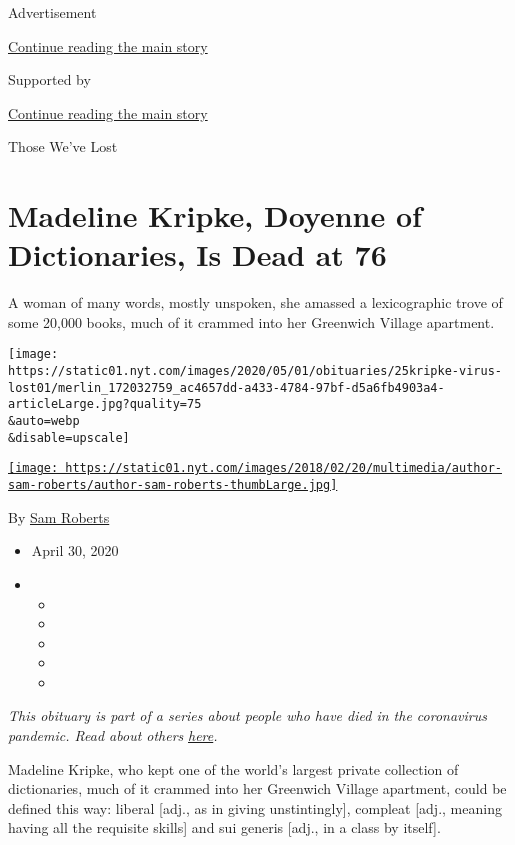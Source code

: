Advertisement

\protect\hyperlink{after-top}{Continue reading the main story}

Supported by

\protect\hyperlink{after-sponsor}{Continue reading the main story}

Those We've Lost

\hypertarget{madeline-kripke-doyenne-of-dictionaries-is-dead-at-76}{%
\section{Madeline Kripke, Doyenne of Dictionaries, Is Dead at
76}\label{madeline-kripke-doyenne-of-dictionaries-is-dead-at-76}}

A woman of many words, mostly unspoken, she amassed a lexicographic
trove of some 20,000 books, much of it crammed into her Greenwich
Village apartment.

\texttt{[image: https://static01.nyt.com/images/2020/05/01/obituaries/25kripke-virus-lost01/merlin\_172032759\_ac4657dd-a433-4784-97bf-d5a6fb4903a4-articleLarge.jpg?quality=75\\\&auto=webp\\\&disable=upscale]}

\href{https://www.nytimes.com/by/sam-roberts}{\texttt{[image: https://static01.nyt.com/images/2018/02/20/multimedia/author-sam-roberts/author-sam-roberts-thumbLarge.jpg]}}

By \href{https://www.nytimes.com/by/sam-roberts}{Sam Roberts}

\begin{itemize}
\item
  April 30, 2020
\item
  \begin{itemize}
  \item
  \item
  \item
  \item
  \item
  \end{itemize}
\end{itemize}

\emph{This obituary is part of a series about people who have died in
the coronavirus pandemic. Read about others}
\href{https://www.nytimes.com/series/people-who-have-died-of-the-coronavirus}{\emph{here}}\emph{.}

Madeline Kripke, who kept one of the world's largest private collection
of dictionaries, much of it crammed into her Greenwich Village
apartment, could be defined this way: liberal {[}adj., as in giving
unstintingly{]}, compleat {[}adj., meaning having all the requisite
skills{]} and sui generis {[}adj., in a class by itself{]}.

